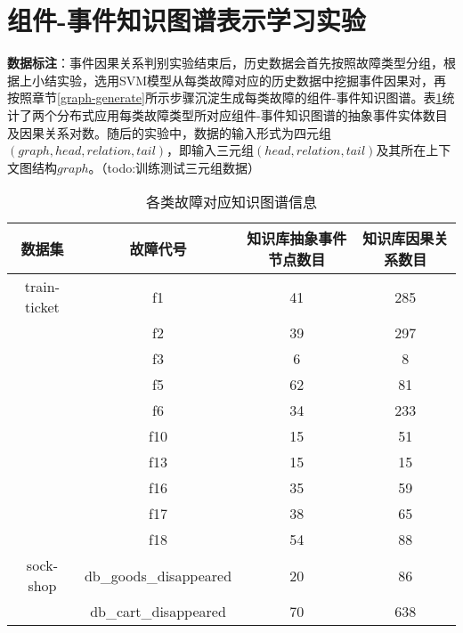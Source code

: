 \section{组件-事件知识图谱表示学习实验}
\textbf{数据标注}：事件因果关系判别实验结束后，历史数据会首先按照故障类型分组，根据上小结实验，选用SVM模型从每类故障对应的历史数据中挖掘事件因果对，再按照章节\ref{graph-generate}所示步骤沉淀生成每类故障的组件-事件知识图谱。表\ref{kg-abstract-event-num}统计了两个分布式应用每类故障类型所对应组件-事件知识图谱的抽象事件实体数目及因果关系对数。随后的实验中，数据的输入形式为四元组$(graph,head,relation,tail)$，即输入三元组$(head,relation,tail)$及其所在上下文图结构$graph$。（todo:训练测试三元组数据）
\begin{table}[htbp]
    \caption{各类故障对应知识图谱信息}
    \centering
    \label{kg-abstract-event-num}
    \begin{tabular}{cccc}
    \hline
    数据集          & 故障代号                                    & 知识库抽象事件节点数目 & 知识库因果关系数目 \\ \hline
    train-ticket & f1                                      & 41          & 285       \\
                 & f2                                      & 39          & 297       \\
                 & f3                                      & 6           & 8         \\
                 & f5                                      & 62          & 81        \\
                 & f6                                      & 34          & 233       \\
                 & f10                                     & 15          & 51        \\
                 & f13                                     & 15          & 15        \\
                 & f16                                     & 35          & 59        \\
                 & f17                                     & 38          & 65        \\
                 & f18                                     & 54          & 88        \\ \hline
    sock-shop    & db\_goods\_disappeared                  & 20          & 86        \\
                 & db\_cart\_disappeared                   & 70          & 638       \\

\end{tabular}
\end{table}
